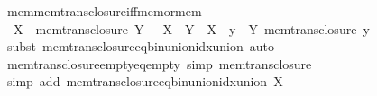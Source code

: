 \begin{isabellebody}
%
\endisadelimproof
\isanewline
{}\isamarkupfalse%
\ mem{\isacharunderscore}{\kern0pt}mem{\isacharunderscore}{\kern0pt}trans{\isacharunderscore}{\kern0pt}closure{\isacharunderscore}{\kern0pt}iff{\isacharunderscore}{\kern0pt}mem{\isacharunderscore}{\kern0pt}or{\isacharunderscore}{\kern0pt}mem{\isacharcolon}{\kern0pt}\isanewline
\ \ {\isachardoublequoteopen}X\ {\isasymin}\ mem{\isacharunderscore}{\kern0pt}trans{\isacharunderscore}{\kern0pt}closure\ Y\ {\isasymlongleftrightarrow}\ \ X\ {\isasymin}\ Y\ {\isasymor}\ {\isacharparenleft}{\kern0pt}X\ {\isasymin}\ {\isacharparenleft}{\kern0pt}{\isasymUnion}y\ {\isasymin}\ Y{\isachardot}{\kern0pt}\ mem{\isacharunderscore}{\kern0pt}trans{\isacharunderscore}{\kern0pt}closure\ y{\isacharparenright}{\kern0pt}{\isacharparenright}{\kern0pt}{\isachardoublequoteclose}\isanewline
%
\isadelimproof
\ \ %
\endisadelimproof
%
\isatagproof
{}\isamarkupfalse%
\ {\isacharparenleft}{\kern0pt}subst\ mem{\isacharunderscore}{\kern0pt}trans{\isacharunderscore}{\kern0pt}closure{\isacharunderscore}{\kern0pt}eq{\isacharunderscore}{\kern0pt}bin{\isacharunderscore}{\kern0pt}union{\isacharunderscore}{\kern0pt}idx{\isacharunderscore}{\kern0pt}union{\isacharparenright}{\kern0pt}\ auto%
\endisatagproof
{\isafoldproof}%
%
\isadelimproof
\isanewline
%
\endisadelimproof
\isanewline
{}\isamarkupfalse%
\ mem{\isacharunderscore}{\kern0pt}trans{\isacharunderscore}{\kern0pt}closure{\isacharunderscore}{\kern0pt}empty{\isacharunderscore}{\kern0pt}eq{\isacharunderscore}{\kern0pt}empty\ {\isacharbrackleft}{\kern0pt}simp{\isacharbrackright}{\kern0pt}{\isacharcolon}{\kern0pt}\ {\isachardoublequoteopen}mem{\isacharunderscore}{\kern0pt}trans{\isacharunderscore}{\kern0pt}closure\ {\isacharbraceleft}{\kern0pt}{\isacharbraceright}{\kern0pt}\ {\isacharequal}{\kern0pt}\ {\isacharbraceleft}{\kern0pt}{\isacharbraceright}{\kern0pt}{\isachardoublequoteclose}\isanewline
%
\isadelimproof
\ \ %
\endisadelimproof
%
\isatagproof
{}\isamarkupfalse%
\ {\isacharparenleft}{\kern0pt}simp\ add{\isacharcolon}{\kern0pt}\ mem{\isacharunderscore}{\kern0pt}trans{\isacharunderscore}{\kern0pt}closure{\isacharunderscore}{\kern0pt}eq{\isacharunderscore}{\kern0pt}bin{\isacharunderscore}{\kern0pt}union{\isacharunderscore}{\kern0pt}idx{\isacharunderscore}{\kern0pt}union{\isacharbrackleft}{\kern0pt}\ {\isacharquery}{\kern0pt}X{\isacharequal}{\kern0pt}{\isachardoublequoteopen}{\isacharbraceleft}{\kern0pt}{\isacharbraceright}{\kern0pt}{\isachardoublequoteclose}{\isacharbrackright}{\kern0pt}{\isacharparenright}{\kern0pt}%

\end{isabellebody}

